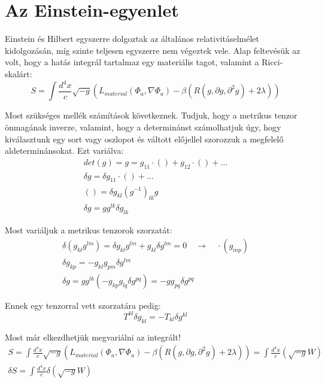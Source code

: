 \documentclass[a4paper,12pt]{article}
\begin{document}
\section{ Az Einstein-egyenlet}
\par Einstein és Hilbert egyszerre dolgoztak az általános relativitáselmélet kidolgozásán, míg szinte teljesen egyszerre nem végeztek vele. Alap feltevésük az volt, hogy a hatás integrál tartalmaz egy materiális tagot, valamint a Ricci-skalárt:
\begin{equation*}
    S = \int \frac{d^{4}x}{c}\sqrt{-g}(L_{material}(\Phi_{a}, \nabla\Phi_{a}) - \beta(R(g, \partial g, \partial^{2}g) + 2\lambda))
\end{equation*}
\par Most szükséges mellék számítások következnek. Tudjuk, hogy a metrikus tenzor önmagának inverze, valamint, hogy a determinánst számolhatjuk úgy, hogy kiválasztunk egy sort vagy oszlopot és váltott előjellel szorozzuk a megfelelő aldeterminánsokat. Ezt variálva:
\begin{align*}
    det(g) = g = g_{11}\cdot() + g_{12}\cdot() + ... \\
    \delta g = \delta g_{11}\cdot() + ... \\
    () = \delta g_{kl}(g^{-1})_{lk} g \\
    \delta g = g g^{lk}\delta g_{lk}
\end{align*}
\par Most variáljuk a metrikus tenzorok szorzatát:
\begin{align*}
    \delta (g_{kl}g^{lm}) = \delta g_{kl} g^{lm} + g_{kl}\delta g^{lm} = 0 \quad \rightarrow \quad \cdot(g_{mp}) \\
    \delta g_{kp} = -g_{kl}g_{pm}\delta g^{lm} \\
    \delta g = g g^{lk}(-g_{kp}g_{lq}\delta g^{pq}) = -g g_{pq} \delta g^{pq}
\end{align*}
\par Ennek egy tenzorral vett szorzatára pedig:
\begin{equation*}
    T^{kl}\delta g_{kl} = - T_{kl}\delta g^{kl}
\end{equation*}
\par Most már elkezdhetjük megvariálni az integrált!
\begin{gather*}
    S = \int \frac{d^{4}x}{c}\sqrt{-g}(L_{material}(\Phi_{a}, \nabla\Phi_{a}) - \beta(R(g, \partial g, \partial^{2}g) + 2\lambda)) = \int \frac{d^{4}x}{c}(\sqrt{-g}W) \\
    \delta S = \int \frac{d^{4}x}{c}\delta (\sqrt{-g}W) \\
\end{gather*}
\end{document}

